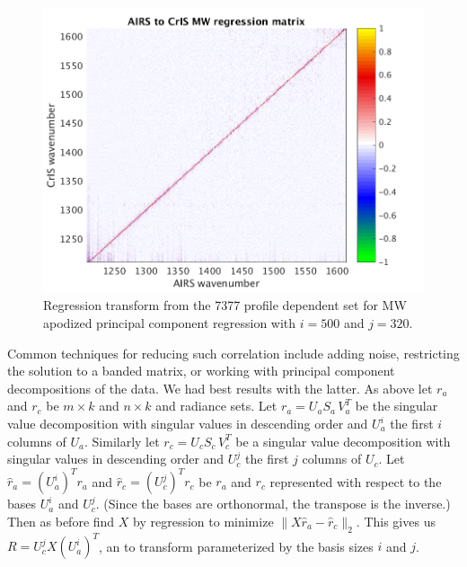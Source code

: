 \documentclass[journal]{IEEEtran}
\begin{document}
\begin{figure} %
  \centering
  \includegraphics[width=\linewidth]{figures/MW_pc_regr_mat.png}
  \caption{Regression transform from the 7377 profile dependent set
    for MW apodized principal component regression with $i = 500$
    and $j = 320$.}
  \label{dreg8}
\end{figure}



Common techniques for reducing such correlation include adding
noise, restricting the solution to a banded matrix, or working with
principal component decompositions of the data.  We had best results
with the latter.  As above let $r_a$ and $r_c$ be $m \times k$ and
$n \times k$ {\airs} and {\cris} radiance sets.  Let $r_a = U_a
S_a\,V_a^T$ be the singular value decomposition with singular values
in descending order and $U_a^i$ the first $i$ columns of $U_a$.
Similarly let $r_c = U_c S_c\,V_c^T$ be a singular value
decomposition with singular values in descending order and $U_c^j$
the first $j$ columns of $U_c$.  Let $\hat r_a = (U_a^i)^T r_a$ and
$\hat r_c = (U_c^j)^T r_c$ be $r_a$ and $r_c$ represented with
respect to the bases $U_a^i$ and $U_c^j$.  (Since the bases are
orthonormal, the transpose is the inverse.)  Then as before find $X$
by regression to minimize $\|X \hat r_a - \hat r_c\|_2$.  This gives
us $R = U_c^j X (U_a^i)^T$, an {\airs} to {\cris} transform
parameterized by the basis sizes $i$ and $j$.
\end{document}
